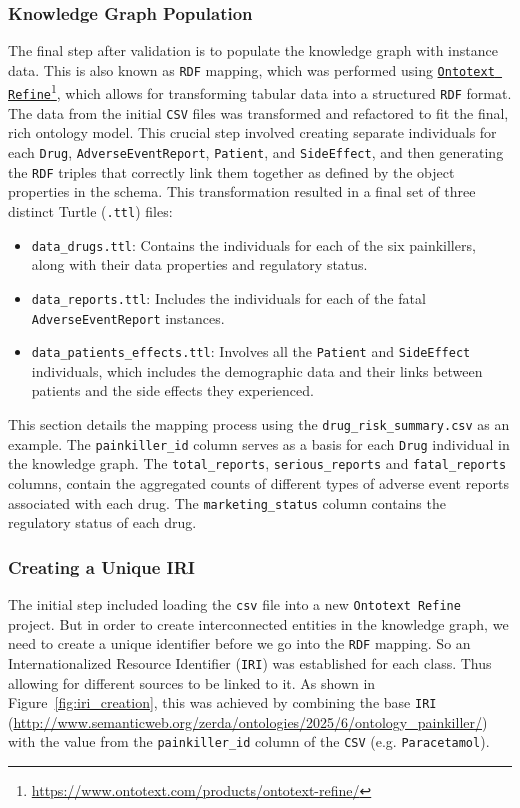 \subsubsection{Knowledge Graph Population}
The final step after validation is to populate the knowledge graph with instance data. This is also known as \texttt{RDF} mapping, which was performed using  \href{https://www.ontotext.com/products/ontotext-refine/}{\texttt{Ontotext Refine}}\footnote{\url{https://www.ontotext.com/products/ontotext-refine/}}, which allows for transforming tabular data into a structured \texttt{RDF} format. The data from the initial \texttt{CSV} files was  transformed and refactored to fit the final, rich ontology model. This crucial step involved creating separate individuals for each \texttt{Drug}, \texttt{Adverse\-Event\-Report}, \texttt{Patient}, and \texttt{Side\-Effect}, and then generating the \texttt{RDF} triples that correctly link them together as defined by the object properties in the schema. This transformation resulted in a final set of three distinct Turtle (\texttt{.ttl}) files:
\begin{itemize}
    \item \nolinkurl{data_drugs.ttl}: Contains the individuals for each of the six painkillers, along with their data properties and regulatory status.
    \item \nolinkurl{data_reports.ttl}: Includes the individuals for each of the fatal \texttt{Adverse\-Event\-Report} instances.
    \item \nolinkurl{data_patients_effects.ttl}: Involves all the \texttt{Patient} and \texttt{Side\-Effect} individuals, which includes the demographic data and their links between patients and the side effects they experienced.
\end{itemize}
This section details the mapping process using the \nolinkurl{drug_risk_summary.csv} as an example. The \texttt{painkiller\_id} column serves as a basis for each \texttt{Drug} individual in the knowledge graph. The \texttt{total\_reports}, \texttt{serious\_reports} and \texttt{fatal\_reports} columns, contain the aggregated counts of different types of adverse event reports associated with each drug. The \texttt{marketing\_status} column contains the regulatory status of each drug.

\subsubsection*{Creating a Unique IRI}
The initial step included loading the \texttt{csv} file into a new \texttt{Ontotext Refine} project. But in order to create interconnected entities in the knowledge graph, we need to create a unique identifier before we go into the \texttt{RDF} mapping. So an Internationalized Resource Identifier (\texttt{IRI}) was established for each class. Thus allowing for different sources to be linked to it. As shown in Figure~\ref{fig:iri_creation}, this was achieved by combining the base \texttt{IRI} (\url{http://www.semanticweb.org/zerda/ontologies/2025/6/ontology_painkiller/}) with the value from the \texttt{painkiller\_id} column of the \texttt{CSV} (e.g. \texttt{Paracetamol}).

